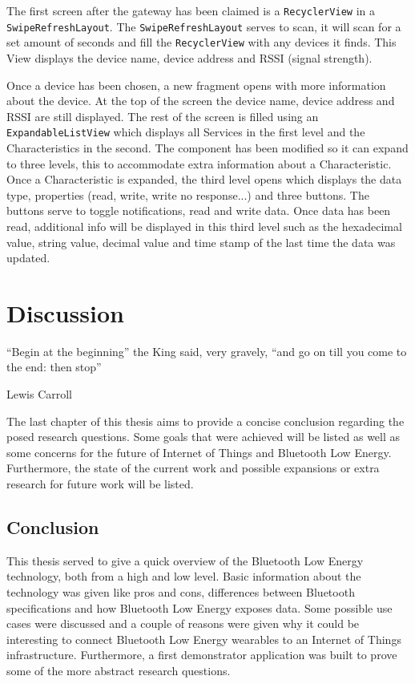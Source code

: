 \documentclass[pdftex,a4paper,12pt,twoside]{report}
\begin{document}
The first screen after the gateway has been claimed is a \texttt{RecyclerView} in a \texttt{SwipeRefreshLayout}. The \texttt{SwipeRefreshLayout} serves to scan, it will scan for a set amount of seconds and fill the \texttt{RecyclerView} with any devices it finds. This View displays the device name, device address and RSSI (signal strength).

Once a device has been chosen, a new fragment opens with more information about the device. At the top of the screen the device name, device address and RSSI are still displayed. The rest of the screen is filled using an \texttt{ExpandableListView} which displays all Services in the first level and the Characteristics in the second. The component has been modified so it can expand to three levels, this to accommodate extra information about a Characteristic. Once a Characteristic is expanded, the third level opens which displays the data type, properties (read, write, write no response...) and three buttons. The buttons serve to toggle notifications, read and write data. Once data has been read, additional info will be displayed in this third level such as the hexadecimal value, string value, decimal value and time stamp of the last time the data was updated.

\chapter{Discussion}
\label{ch:discussion}
\epigraph{``Begin at the beginning'' the King said, very gravely, ``and go on till you come to the end: then stop''}{Lewis Carroll}
The last chapter of this thesis aims to provide a concise conclusion regarding the posed research questions. Some goals that were achieved will be listed as well as some concerns for the future of Internet of Things and Bluetooth Low Energy. Furthermore, the state of the current work and possible expansions or extra research for future work will be listed.

\section{Conclusion}
\label{sec:conclusion}
This thesis served to give a quick overview of the Bluetooth Low Energy technology, both from a high and low level. Basic information about the technology was given like pros and cons, differences between Bluetooth specifications and how Bluetooth Low Energy exposes data. Some possible use cases were discussed and a couple of reasons were given why it could be interesting to connect Bluetooth Low Energy wearables to an Internet of Things infrastructure. Furthermore, a first demonstrator application was built to prove some of the more abstract research questions.
\end{document}
